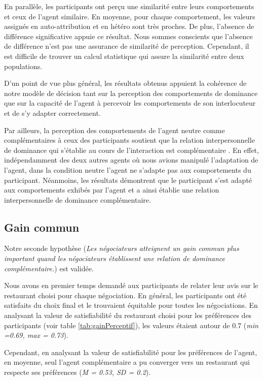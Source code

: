 	En parallèle, les participants ont perçu une similarité entre leurs comportements et ceux de l'agent similaire. En moyenne, pour chaque comportement, les valeurs assignés en auto-attribution et en hétéro sont très proches. De plus, l'absence de différence significative appuie ce résultat. Nous sommes conscients que l'absence de différence n'est pas une assurance de similarité de perception. Cependant, il est difficile de trouver un calcul statistique qui assure la similarité entre deux populations.
	
	D’un point de vue plus général, les résultats obtenus appuient la cohérence de notre modèle de décision tant sur la perception des comportements de dominance que sur la capacité de l'agent à percevoir les comportements de son interlocuteur et de s'y adapter correctement.  
	
	Par ailleurs, la perception des comportements de l'agent neutre comme complémentaires à ceux des participants soutient que la relation interpersonnelle de dominance qui s'établie au cours de l'interaction est complémentaire \cite{burgoonnonverbal}. En effet, indépendamment des deux autres agents où nous avions manipulé l'adaptation de l'agent, dans la condition neutre l'agent ne s'adapte pas aux comportements du participant. Néanmoins, les résultats démontrent que le participant s'est adapté aux comportements exhibés par l'agent et a ainsi établie une relation interpersonnelle de dominance complémentaire.
	
	\subsection{Gain commun}
	Notre seconde hypothèse (\textit{Les négociateurs atteignent un gain commun plus important quand les négociateurs établissent une relation de dominance complémentaire.}) est validée. 
	
	Nous avons en premier temps demandé aux participants de relater leur avis sur le restaurant choisi pour chaque négociation.
	En général, les participants ont été satisfaits du choix final et le trouvaient équitable pour toutes les négociations. 
	En analysant la valeur de satisfiabilité du restaurant choisi pour les préférences des participants (voir table \ref{tab:gainPerceptif}), les valeurs étaient autour de 0.7 (\emph{min =0.69, max = 0.73}). 
	
	Cependant, en analysant la valeur de satisfiabilité pour les préférences de l'agent,  en moyenne, seul l'agent complémentaire a pu converger vers un restaurant qui respecte ses préférences (\emph{M = 0.53, SD = 0.2}). 
	
